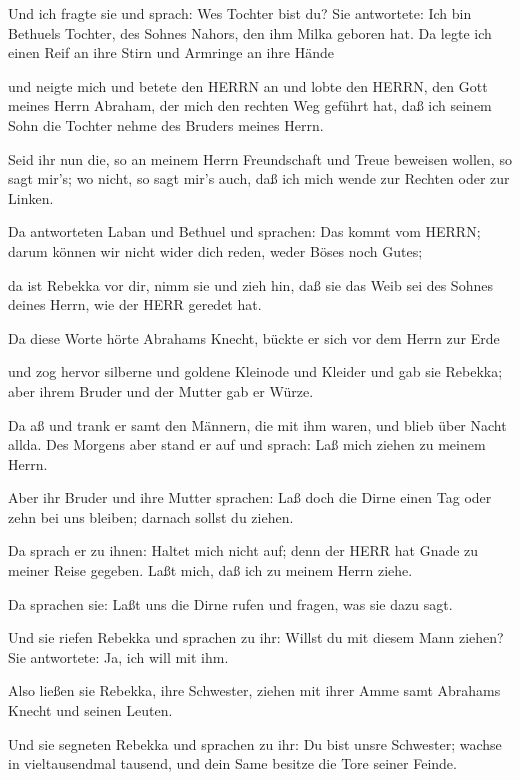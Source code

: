  Und ich fragte sie und sprach: Wes Tochter bist du? Sie
antwortete: Ich bin Bethuels Tochter, des Sohnes Nahors, den ihm Milka
geboren hat. Da legte ich einen Reif an ihre Stirn und Armringe an ihre
Hände

 und neigte mich und betete den HERRN an und lobte den
HERRN, den Gott meines Herrn Abraham, der mich den rechten Weg geführt
hat, daß ich seinem Sohn die Tochter nehme des Bruders meines Herrn.

 Seid ihr nun die, so an meinem Herrn Freundschaft und
Treue beweisen wollen, so sagt mir's; wo nicht, so sagt mir's auch, daß
ich mich wende zur Rechten oder zur Linken.

 Da antworteten Laban und Bethuel und sprachen: Das kommt
vom HERRN; darum können wir nicht wider dich reden, weder Böses noch
Gutes;

 da ist Rebekka vor dir, nimm sie und zieh hin, daß sie das
Weib sei des Sohnes deines Herrn, wie der HERR geredet hat.

 Da diese Worte hörte Abrahams Knecht, bückte er sich vor
dem Herrn zur Erde

 und zog hervor silberne und goldene Kleinode und Kleider
und gab sie Rebekka; aber ihrem Bruder und der Mutter gab er Würze.

 Da aß und trank er samt den Männern, die mit ihm waren,
und blieb über Nacht allda. Des Morgens aber stand er auf und sprach:
Laß mich ziehen zu meinem Herrn.

 Aber ihr Bruder und ihre Mutter sprachen: Laß doch die
Dirne einen Tag oder zehn bei uns bleiben; darnach sollst du ziehen.

 Da sprach er zu ihnen: Haltet mich nicht auf; denn der
HERR hat Gnade zu meiner Reise gegeben. Laßt mich, daß ich zu meinem
Herrn ziehe.

 Da sprachen sie: Laßt uns die Dirne rufen und fragen, was
sie dazu sagt.

 Und sie riefen Rebekka und sprachen zu ihr: Willst du mit
diesem Mann ziehen? Sie antwortete: Ja, ich will mit ihm.

 Also ließen sie Rebekka, ihre Schwester, ziehen mit ihrer
Amme samt Abrahams Knecht und seinen Leuten.

 Und sie segneten Rebekka und sprachen zu ihr: Du bist
unsre Schwester; wachse in vieltausendmal tausend, und dein Same besitze
die Tore seiner Feinde.

